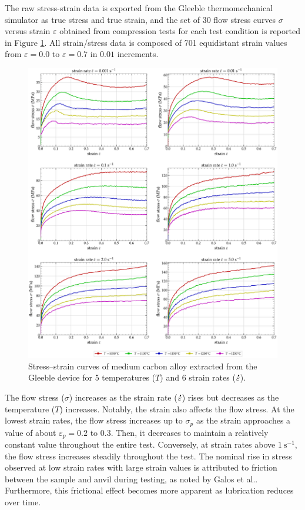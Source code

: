 \documentclass[metals,article,submit,pdftex,moreauthors]{Definitions/mdpi}
\makeatletter
\DeclareRobustCommand{\mdot}[1]{\accentset{\mbox{\bfseries .}}{#1}}
\DeclareRobustCommand{\eal}{et al.\@\xspace}
\DeclareRobustCommand{\ps}{\text{s}^{-1}}
\makeatother
\begin{document}
The raw stress-strain data is exported from the Gleeble thermomechanical simulator as true stress and true strain, and the set of 30 flow stress curves $\sigma$ versus strain $\varepsilon$ obtained from compression tests for each test condition is reported in Figure \ref{fig:RawData}.
All strain/stress data is composed of 701 equidistant strain values from $\varepsilon=0.0$ to $\varepsilon=0.7$ in $0.01$ increments.
\begin{figure}[H]
\centering
\includegraphics[width=0.9\columnwidth]{Figures/rawData}
\caption{Stress--strain curves of medium carbon alloy extracted from the Gleeble device for 5 temperatures ($T$) and 6 strain rates ($\mdot\varepsilon$).}
\label{fig:RawData}
\end{figure}

The flow stress ($\sigma$) increases as the strain rate ($\mdot\varepsilon$) rises but decreases as the temperature ($T$) increases.
Notably, the strain also affects the flow stress.
At the lowest strain rates, the flow stress increases up to $\sigma_p$ as the strain approaches a value of about $\varepsilon_p=0.2$ to $0.3$.
Then, it decreases to maintain a relatively constant value throughout the entire test.
Conversely, at strain rates above $1~\ps$, the flow stress increases steadily throughout the test.
The nominal rise in stress observed at low strain rates with large strain values is attributed to friction between the sample and anvil during testing, as noted by Galos \eal \cite{Galos-2022}.
Furthermore, this frictional effect becomes more apparent as lubrication reduces over time.
\end{document}
